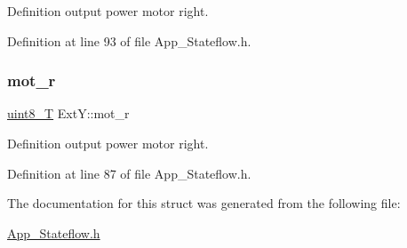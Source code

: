 Definition output power motor right. 



Definition at line 93 of file App\+\_\+\+Stateflow.\+h.

\mbox{\label{struct_ext_y_aa589c8750c337a99456c3e29975ec7fb}} 
\subsubsection{\texorpdfstring{mot\_r}{mot\_r}}
{\footnotesize\ttfamily \mbox{\hyperlink{_app___stateflowtypes_8h_a2532a6244e023eee49f315c10f1f7c53}{uint8\+\_\+T}} Ext\+Y\+::mot\+\_\+r}



Definition output power motor right. 



Definition at line 87 of file App\+\_\+\+Stateflow.\+h.



The documentation for this struct was generated from the following file\+:\begin{DoxyCompactItemize}
\item 
\mbox{\hyperlink{_app___stateflow_8h}{App\+\_\+\+Stateflow.\+h}}\end{DoxyCompactItemize}
